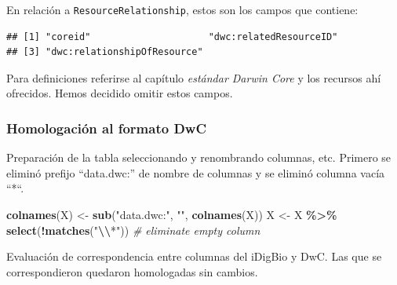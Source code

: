 \documentclass[sn-apa,pdflatex]{sn-jnl}
\newenvironment{Shaded}{\begin{snugshade}}{\end{snugshade}}
\newcommand{\AttributeTok}[1]{\textcolor[rgb]{0.13,0.29,0.53}{#1}}
\newcommand{\CommentTok}[1]{\textcolor[rgb]{0.56,0.35,0.01}{\textit{#1}}}
\newcommand{\FunctionTok}[1]{\textcolor[rgb]{0.13,0.29,0.53}{\textbf{#1}}}
\newcommand{\NormalTok}[1]{#1}
\newcommand{\OtherTok}[1]{\textcolor[rgb]{0.56,0.35,0.01}{#1}}
\newcommand{\SpecialCharTok}[1]{\textcolor[rgb]{0.81,0.36,0.00}{\textbf{#1}}}
\newcommand{\StringTok}[1]{\textcolor[rgb]{0.31,0.60,0.02}{#1}}
\begin{document}
En relación a \texttt{ResourceRelationship}, estos son los campos que
contiene:

\begin{Shaded}
\end{Shaded}

\begin{verbatim}
## [1] "coreid"                     "dwc:relatedResourceID"     
## [3] "dwc:relationshipOfResource"
\end{verbatim}

Para definiciones referirse al capítulo \emph{estándar Darwin Core} y
los recursos ahí ofrecidos. Hemos decidido omitir estos campos.

\subsubsection{Homologación al formato
DwC}\label{homologaciuxf3n-al-formato-dwc-2}

Preparación de la tabla seleccionando y renombrando columnas, etc.
Primero se eliminó prefijo ``data.dwc:'' de nombre de columnas y se
eliminó columna vacía ``*``.

\begin{Shaded}
\begin{Highlighting}[]
\FunctionTok{colnames}\NormalTok{(X) }\OtherTok{\textless{}{-}} \FunctionTok{sub}\NormalTok{(}\StringTok{"data.dwc:"}\NormalTok{, }\StringTok{""}\NormalTok{, }\FunctionTok{colnames}\NormalTok{(X))}
\NormalTok{X }\OtherTok{\textless{}{-}}\NormalTok{ X }\SpecialCharTok{\%\textgreater{}\%}
    \FunctionTok{select}\NormalTok{(}\SpecialCharTok{!}\FunctionTok{matches}\NormalTok{(}\StringTok{"}\SpecialCharTok{\textbackslash{}\textbackslash{}}\StringTok{*"}\NormalTok{))  }\CommentTok{\# eliminate empty column}
\end{Highlighting}
\end{Shaded}

Evaluación de correspondencia entre columnas del iDigBio y DwC. Las que
se correspondieron quedaron homologadas sin cambios.
\end{document}
